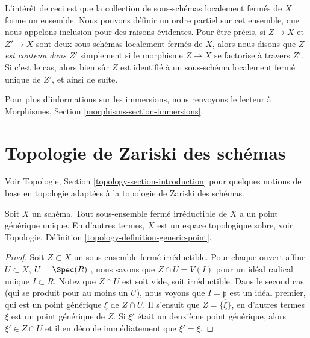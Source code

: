 \medskip\noindent
L'intérêt de ceci est que la collection de sous-schémas localement fermés de
 $X$  forme un ensemble. Nous pouvons définir un ordre partiel sur cet
ensemble, que nous appelons inclusion pour des raisons évidentes. Pour être
précis, si  $Z \to X$  et  $Z' \to X$  sont deux sous-schémas localement fermés
de  $X$, alors nous disons que  {\it   $Z$  est
contenu dans  $Z'$}  simplement si le morphisme  $Z \to X$  se
factorise à travers  $Z'$. Si c’est le cas, alors bien sûr  $Z$  est
identifié à un sous-schéma localement fermé unique de  $Z'$, et ainsi de
suite.

\medskip\noindent
Pour plus d’informations sur les immersions, nous renvoyons le lecteur à
Morphismes, Section  \ref{morphisms-section-immersions}.










\section{Topologie de Zariski des schémas}
\label{section-topology}

\noindent
Voir Topologie, Section  \ref{topology-section-introduction}  pour quelques notions de base en topologie
adaptées à la topologie de Zariski des schémas.

\begin{lemma}
\label{lemma-scheme-sober}
Soit  $X$  un schéma. Tout sous-ensemble fermé irréductible de  $X$ 
a un point générique unique. En d'autres termes,  $X$  est un espace
topologique sobre, voir Topologie, Définition  \ref{topology-definition-generic-point}.
\end{lemma}

\begin{proof}
Soit  $Z \subset X$  un sous-ensemble fermé irréductible. Pour chaque ouvert affine
 $U \subset X$,  $U = \Spec(R)$ , nous savons que  $Z \cap U = V(I)$  pour un idéal radical
unique  $I \subset R$. Notez que  $Z \cap U$  est soit vide, soit irréductible. Dans
le second cas (qui se produit pour au moins un  $U$), nous voyons que
 $I = \mathfrak p$  est un idéal premier, qui est un point générique  $\xi$  de
 $Z \cap U$. Il s'ensuit que  $Z = \overline{\{\xi\}}$, en d'autres termes  $\xi$  est un
point générique de  $Z$. Si  $\xi'$  était un deuxième point
générique, alors  $\xi' \in Z \cap U$  et il en découle immédiatement que  $\xi' = \xi$.
\end{proof}

